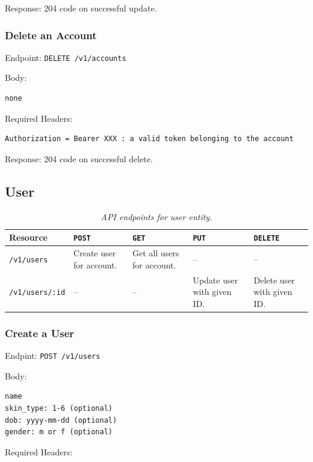 \documentclass[12pt,openany,a4paper]{book}
\begin{document}
Response: 204 code on successful update.

\subsubsection{Delete an Account}

Endpoint: \verb|DELETE /v1/accounts|

Body:

\begin{verbatim}
none
\end{verbatim}

Required Headers: 

\begin{verbatim}
Authorization = Bearer XXX : a valid token belonging to the account
\end{verbatim}

Response: 204 code on successful delete.

\subsection{User}

\begin{table}[h]
\caption{\sl API endpoints for user entity.}
\label{tab:endpoint_user}
\begin{center}
\begin{tabularx}{\linewidth}{|l|X|X|X|X|}
\hline
Resource & \verb|POST| & \verb|GET| & \verb|PUT| & \verb|DELETE| \\
\hline
\verb|/v1/users| & Create user for account. & Get all users for account. & -- & -- \\
\verb|/v1/users/:id| & -- & -- & Update user with given ID. & Delete user with given ID. \\
\hline
\end{tabularx}
\end{center}
\end{table}

\subsubsection{Create a User}

Endpint: \verb|POST /v1/users|

Body:
\begin{verbatim}
name
skin_type: 1-6 (optional)
dob: yyyy-mm-dd (optional)
gender: m or f (optional)
\end{verbatim}

Required Headers: 
\end{document}

